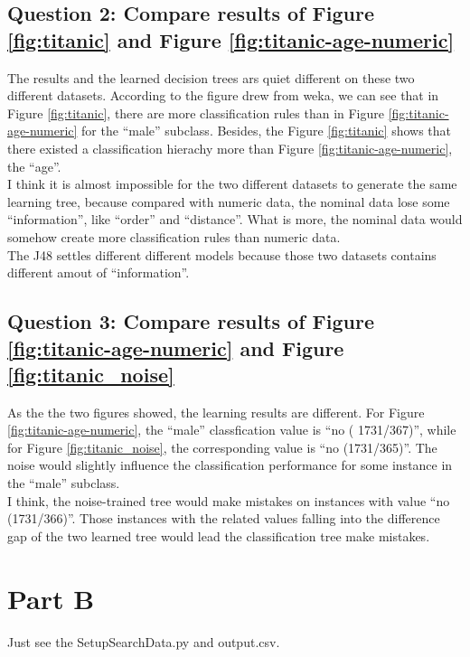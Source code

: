 \documentclass{article} %
\begin{document}
\subsection{Question 2: Compare results of Figure \ref{fig:titanic} and
Figure \ref{fig:titanic-age-numeric}}
The results and the learned decision trees ars quiet different on these two
different datasets. According to the figure drew from weka, we can see that in
Figure \ref{fig:titanic}, there are more classification rules than in Figure
\ref{fig:titanic-age-numeric} for the ``male'' subclass. Besides, the Figure
\ref{fig:titanic} shows that there existed a classification hierachy more than
Figure \ref{fig:titanic-age-numeric}, the ``age''.\\
I think it is almost impossible for the two different datasets to generate the
same learning tree, because compared with numeric data, the nominal data lose
some ``information'', like ``order'' and ``distance''. What is more, the nominal data
would somehow create more classification rules than numeric data.\\
The J48 settles different different models because those two datasets contains
different amout of ``information''.


\subsection{Question 3: Compare results of Figure \ref{fig:titanic-age-numeric} and
Figure \ref{fig:titanic_noise}}
As the the two figures showed, the learning results are different. For Figure
\ref{fig:titanic-age-numeric}, the ``male'' classfication value is ``no (
1731/367)'', while for Figure \ref{fig:titanic_noise}, the corresponding value
is ``no (1731/365)''. The noise would slightly influence the classification
performance for some instance in the ``male'' subclass.\\
I think, the noise-trained tree would make mistakes on instances with value ``no
(1731/366)''. Those instances with the related values falling into the
difference gap of the two learned tree would lead the classification tree make
mistakes.


\section{Part B}
Just see the SetupSearchData.py and output.csv.
\end{document}
